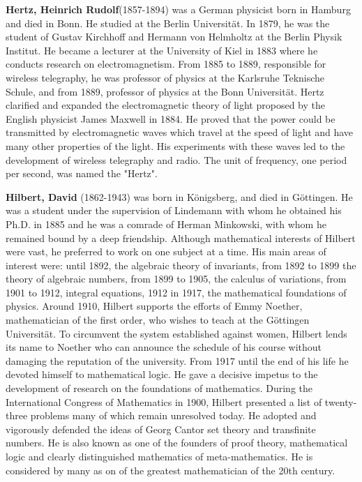 \textbf{Hertz, Heinrich Rudolf}(1857-1894) was a German physicist born in Hamburg and died in Bonn. He studied at the Berlin Universität. In 1879, he was the student of Gustav Kirchhoff and Hermann von Helmholtz at the Berlin Physik Institut. He became a lecturer at the University of Kiel in 1883 where he conducts research on electromagnetism. From 1885 to 1889, responsible for wireless telegraphy, he was professor of physics at the Karlsruhe Teknische Schule, and from 1889, professor of physics at the Bonn Universität. Hertz clarified and expanded the electromagnetic theory of light proposed by the English physicist James Maxwell in 1884. He proved that the power could be transmitted by electromagnetic waves which travel at the speed of light and have many other properties of the light. His experiments with these waves led to the development of wireless telegraphy and radio. The unit of frequency, one period per second, was named the "Hertz".

\textbf{Hilbert, David} (1862-1943) was born in Königsberg, and died in Göttingen. He was a student under the supervision of Lindemann with whom he obtained his Ph.D. in 1885 and he was a comrade of Herman Minkowski, with whom he remained bound by a deep friendship. Although mathematical interests of Hilbert were vast, he preferred to work on one subject at a time. His main areas of interest were: until 1892, the algebraic theory of invariants, from 1892 to 1899 the theory of algebraic numbers, from 1899 to 1905, the calculus of variations, from 1901 to 1912, integral equations, 1912 in 1917, the mathematical foundations of physics. Around 1910, Hilbert supports the efforts of Emmy Noether, mathematician of the first order, who wishes to teach at the Göttingen Universität. To circumvent the system established against women, Hilbert lends its name to Noether who can announce the schedule of his course without damaging the reputation of the university. From 1917 until the end of his life he devoted himself to mathematical logic. He gave a decisive impetus to the development of research on the foundations of mathematics. During the International Congress of Mathematics in 1900, Hilbert presented a list of twenty-three problems many of which remain unresolved today. He adopted and vigorously defended the ideas of Georg Cantor set theory and transfinite numbers. He is also known as one of the founders of proof theory, mathematical logic and clearly distinguished mathematics of meta-mathematics. He is considered by many as on of the greatest mathematician of the 20th century.

